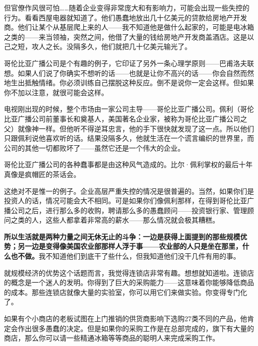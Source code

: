 但官僚作风很可怕……随着企业变得非常庞大和有影响力，可能会出现一些失控的行为。看看西屋电器就知道了。他们愚蠢地放出几十亿美元的贷款给房地产开发商。他们让某个从基层爬上来的人——我不知道他是做什么起家的，可能是电冰箱之类的——来当领袖，突然之间，他借了大量的钱给房地产开发商盖酒店。这是以己之短，攻人之长。没隔多久，他们就把几十亿美元输光了。
\par

哥伦比亚广播公司是个有趣的例子，它印证了另外一条心理学原则——巴甫洛夫联想。如果人们说了你确实不想听的话——也就是让你不高兴的话——你会自然而然地生出抵触情绪。你必须训练自己摆脱这种反应。倒不是说你一定会这样。但如果你不加以注意，就很可能会这样。
\par

电视刚出现的时候，整个市场由一家公司主导——哥伦比亚广播公司。佩利（哥伦比亚广播公司前董事长和奠基人，美国著名企业家，被称为哥伦比亚广播公司之父）就像神一样。但他听不得逆耳忠言，他的手下很快就发现了这一点。所以他们只跟佩利说他喜欢听的话。结果没隔多久，他就生活在一个谎言编织的世界里，而公司的其他一切都败坏了——虽然它还是一个伟大的企业。
\par

哥伦比亚广播公司的各种蠢事都是由这种风气造成的。比尔·佩利掌权的最后十年真像是疯帽匠的茶话会。
\par

这绝对不是惟一的例子。企业高层严重失控的情况是很普遍的。当然，如果你们是投资人的话，情况可能会大不相同。可是如果你们像佩利那样，在得到哥伦比亚广播公司之后，进行那么多的收购，聘请那么多的愚蠢顾问——投资银行家、管理顾问之类的人，这些人都拿着非常高的薪水——那么情况就会极其糟糕。
\par

\textbf{所以生活就是两种力量之间无休无止的斗争：一边是获得上面提到的那些规模优势；另一边是变得像美国农业部那样人浮于事——农业部的人只是坐在那里，什么也不做。}我不知道他们到底干了些什么，但我知道他们没干几件有用的事。
\par

就规模经济的优势这个话题而言，我觉得连锁店非常有趣。想想就知道啦。连锁店的概念是一个迷人的发明。你得到了巨大的采购能力——这意味着你能够降低商品的成本。那些连锁店就像大量的实验室，你可以用它们来做实验。你变得专门化了。
\par

如果有个小商店的老板试图在上门推销的供货商影响下选购27类不同的产品，他肯定会作出很多愚蠢的决定。但是如果你的采购工作是在总部完成的，旗下有大量的商店，那么你可以请一些精通冰箱等等商品的聪明人来完成采购工作。
\par

